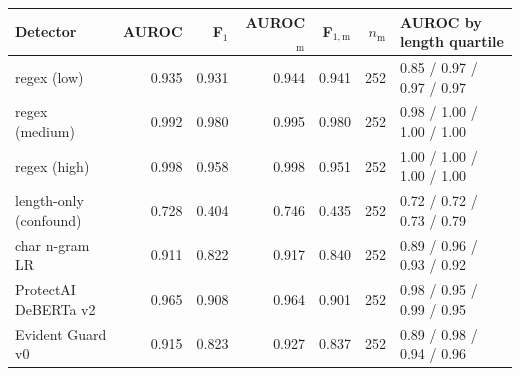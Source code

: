\begin{tabular}{@{}lrrrrrl@{}}
\toprule
Detector & AUROC & F$_1$ & AUROC$_\mathrm{m}$ & F$_{1,\mathrm{m}}$ & $n_\mathrm{m}$ & AUROC by length quartile \\
\midrule
regex (low) & 0.935 & 0.931 & 0.944 & 0.941 & 252 & 0.85 / 0.97 / 0.97 / 0.97 \\
regex (medium) & 0.992 & 0.980 & 0.995 & 0.980 & 252 & 0.98 / 1.00 / 1.00 / 1.00 \\
regex (high) & 0.998 & 0.958 & 0.998 & 0.951 & 252 & 1.00 / 1.00 / 1.00 / 1.00 \\
length-only (confound) & 0.728 & 0.404 & 0.746 & 0.435 & 252 & 0.72 / 0.72 / 0.73 / 0.79 \\
char n-gram LR & 0.911 & 0.822 & 0.917 & 0.840 & 252 & 0.89 / 0.96 / 0.93 / 0.92 \\
ProtectAI DeBERTa v2 & 0.965 & 0.908 & 0.964 & 0.901 & 252 & 0.98 / 0.95 / 0.99 / 0.95 \\
Evident Guard v0 & 0.915 & 0.823 & 0.927 & 0.837 & 252 & 0.89 / 0.98 / 0.94 / 0.96 \\
\bottomrule
\end{tabular}

